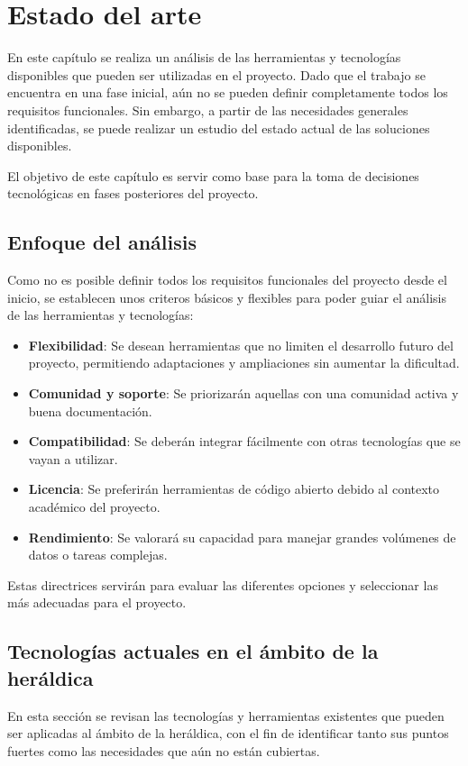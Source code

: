 \chapter{Estado del arte}

En este capítulo se realiza un análisis de las herramientas y tecnologías
disponibles que pueden ser utilizadas en el proyecto. Dado que el trabajo se 
encuentra en una fase inicial, aún no se pueden definir completamente todos
los requisitos funcionales. Sin embargo, a partir de las necesidades
generales identificadas, se puede realizar un estudio del estado actual
de las soluciones disponibles.

El objetivo de este capítulo es servir como base para la toma de 
decisiones tecnológicas en fases posteriores del proyecto.

\section{Enfoque del análisis}
Como no es posible definir todos los requisitos funcionales del proyecto
desde el inicio, se establecen unos criteros básicos y flexibles para
poder guiar el análisis de las herramientas y tecnologías:

\begin{itemize}
    \item \textbf{Flexibilidad}: Se desean herramientas que no limiten el desarrollo
    futuro del proyecto, permitiendo adaptaciones y ampliaciones sin aumentar la dificultad.
    \item \textbf{Comunidad y soporte}: Se priorizarán aquellas con una comunidad activa
    y buena documentación.
    \item \textbf{Compatibilidad}: Se deberán integrar fácilmente con otras tecnologías
    que se vayan a utilizar.
    \item \textbf{Licencia}: Se preferirán herramientas de código abierto debido al
    contexto académico del proyecto.
    \item \textbf{Rendimiento}: Se valorará su capacidad para manejar grandes volúmenes
    de datos o tareas complejas.
\end{itemize}

Estas directrices servirán para evaluar las diferentes opciones y seleccionar las más 
adecuadas para el proyecto.

\section{Tecnologías actuales en el ámbito de la heráldica}
En esta sección se revisan las tecnologías y herramientas existentes que pueden ser
aplicadas al ámbito de la heráldica, con el fin de identificar tanto sus puntos fuertes
como las necesidades que aún no están cubiertas.

